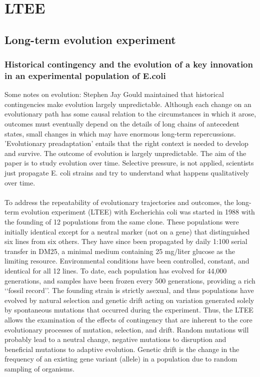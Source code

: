 \graphicspath{{chapters/images/ltee/}}
\chapter{LTEE}

\section{Long-term evolution experiment}
\subsection{Historical contingency and the evolution of a key innovation in an experimental population of E.coli}
Some notes on evolution:  Stephen Jay Gould maintained that historical contingencies make evolution largely unpredictable. Although each change on an evolutionary path has some causal relation to the circumstances in which it arose, outcomes must eventually depend on the details of long chains of antecedent states, small changes in which may have enormous long-term repercussions.  
'Evolutionary preadaptation’  entails that the right context is needed to develop and survive.
The outcome of evolution is largely unpredictable. 
The aim of the paper is to study evolution over time.  Selective pressure,  is not applied, scientists just propagate E. coli strains and try to understand what happens qualitatively over time.
\\
\\
\noindent
To address the repeatability of evolutionary trajectories and outcomes, the long-term evolution experiment (LTEE) with Escherichia coli was started in 1988 with the founding of 12 populations from the same clone. These populations were initially identical except for a neutral marker (not on a gene) that distinguished six lines from six others. They have since been propagated by daily 1:100 serial transfer in DM25, a minimal medium containing 25 mg/liter glucose as the limiting resource. Environmental conditions have been controlled, constant, and identical for all 12 lines. To date, each population has evolved for 44,000 generations, and samples have been frozen every 500 generations, providing a rich ‘‘fossil record’’. The founding strain is strictly asexual, and thus populations have evolved by natural selection and genetic drift acting on variation generated solely by spontaneous mutations that occurred during the experiment. Thus, the LTEE allows the examination of the effects of contingency that are inherent to the core evolutionary processes of mutation, selection, and drift. Random mutations will probably lead to a neutral change, negative mutations to disruption and beneficial mutations to adaptive evolution. Genetic drift is the change in the frequency of an existing gene variant (allele) in a population due to random sampling of organisms.
